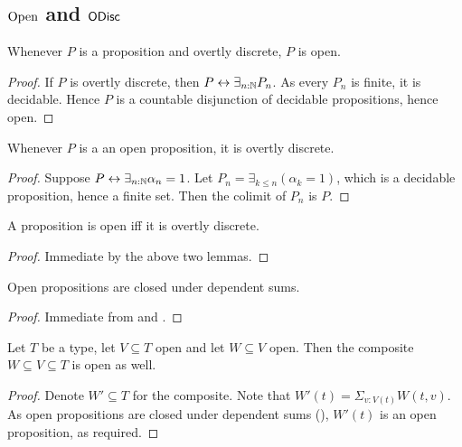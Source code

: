 
\subsection{$\mathrm{Open}$ and $\mathsf{ODisc}$} %
\begin{lemma}
  Whenever $P$ is a proposition and overtly discrete, $P$ is open. 
\end{lemma}
\begin{proof}
  If $P$ is overtly discrete, then $P\leftrightarrow \exists_{n:\mathbb{N}} P_n$. 
  As every $P_n$ is finite, it is decidable. 
  Hence $P$ is a countable disjunction of decidable propositions, hence open.%
\end{proof}
\begin{lemma}
  Whenever $P$ is a an open proposition, it is overtly discrete.
\end{lemma}
\begin{proof}
  Suppose $P\leftrightarrow \exists_{n:\mathbb{N}} \alpha_n = 1$. 
  Let $P_n = \exists_{k\leq n} (\alpha_k = 1)$, which is a decidable proposition, hence a finite set. 
  Then the colimit of $P_n$ is $P$. 
\end{proof} 
\begin{corollary}\label{PropOpenIffOdisc}
  A proposition is open iff it is overtly discrete.
\end{corollary}
\begin{proof}
  Immediate by the above two lemmas. 
\end{proof}
\begin{corollary}\label{OpenDependentSums}
  Open propositions are closed under dependent sums. 
\end{corollary}
\begin{proof}
  Immediate from  and .
\end{proof}
\begin{corollary}\label{OpenTransitive}
  Let $T$ be a type, let $V\subseteq T$ open and let $W\subseteq V$ open. 
  Then the composite $W\subseteq V\subseteq T$ is open as well. 
\end{corollary}
\begin{proof}
  Denote $W'\subseteq T$ for the composite. 
  Note that $W'(t) = \Sigma_{v:V(t)} W(t,v)$. 
  As open propositions are closed under dependent sums (), 
  $W'(t)$ is an open proposition, as required. 
\end{proof}

